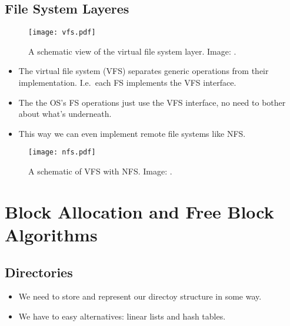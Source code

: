 \documentclass{beamer}
\begin{document}
\subsection{File System Layeres}

\begin{frame}{\insertsubsectionhead}
  \begin{figure}
    \texttt{[image: vfs.pdf]}
    \caption{A schematic view of the virtual file system layer.
      Image: \cite{Silberschatz2013osc}.}
  \end{figure}
\end{frame}

\begin{frame}{\insertsubsectionhead}
  \begin{itemize}
    \item The virtual file system (VFS) separates generic operations from their 
      implementation.
      I.e.\ each FS implements the VFS interface.

    \item The the OS's FS operations just use the VFS interface, no need to 
      bother about what's underneath.

    \item This way we can even implement remote file systems like NFS.

  \end{itemize}
\end{frame}

\begin{frame}{\insertsubsectionhead}
  \begin{figure}
    \texttt{[image: nfs.pdf]}
    \caption{A schematic of VFS with NFS.
      Image: \cite{Silberschatz2013osc}.}
  \end{figure}
\end{frame}


\section[Block Allocation]{Block Allocation and Free Block Algorithms}

\subsection{Directories}

\begin{frame}{\insertsubsectionhead}
  \begin{itemize}
    \item We need to store and represent our directoy structure in some way.

    \item We have to easy alternatives: linear lists and hash tables.
  \end{itemize}
\end{frame}
\end{document}
